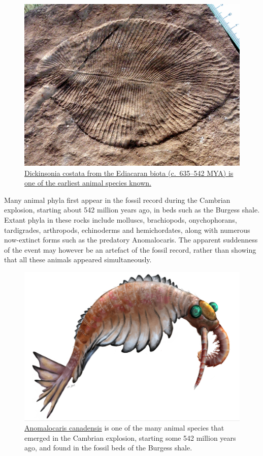 \begin{figure}

{\centering \includegraphics[width=0.7\linewidth]{./figures/animals/DickinsoniaCostata} 

}

\caption{\href{https://commons.wikimedia.org/wiki/File:DickinsoniaCostata.jpg}{Dickinsonia costata from the Ediacaran biota (c.~635--542 MYA) is one of the earliest animal species known.}}\label{fig:ediacara}
\end{figure}

Many animal phyla first appear in the fossil record during the Cambrian explosion, starting about 542 million years ago, in beds such as the Burgess shale. Extant phyla in these rocks include molluscs, brachiopods, onychophorans, tardigrades, arthropods, echinoderms and hemichordates, along with numerous now-extinct forms such as the predatory Anomalocaris. The apparent suddenness of the event may however be an artefact of the fossil record, rather than showing that all these animals appeared simultaneously.



\begin{figure}

{\centering \includegraphics[width=0.7\linewidth]{./figures/animals/Anomalocaris2019} 

}

\caption{\href{https://commons.wikimedia.org/wiki/File:Anomalocaris2019.jpg}{Anomalocaris canadensis} is one of the many animal species that emerged in the Cambrian explosion, starting some 542 million years ago, and found in the fossil beds of the Burgess shale.}\label{fig:amomalocaris}
\end{figure}

